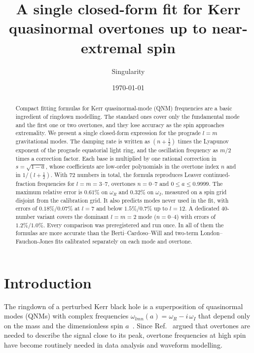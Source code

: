 \documentclass[prd,twocolumn,superscriptaddress,nofootinbib]{revtex4-2}
\begin{document}
\title{A single closed-form fit for Kerr quasinormal overtones up to near-extremal spin}

\author{Singularity}
\affiliation{}

\date{\today}

\begin{abstract}
Compact fitting formulas for Kerr quasinormal-mode (QNM) frequencies are a basic ingredient of ringdown modelling.
The standard ones cover only the fundamental mode and the first one or two overtones, and they lose accuracy as the
spin approaches extremality. We present a single closed-form expression for the prograde $l=m$ gravitational modes.
The damping rate is written as $(n+\tfrac12)$ times the Lyapunov exponent of the prograde equatorial light ring, and
the oscillation frequency as $m/2$ times a correction factor. Each base is multiplied by one rational correction in
$s=\sqrt{1-a}$, whose coefficients are low-order polynomials in the overtone index $n$ and in $1/(l+\tfrac12)$. With
72 numbers in total, the formula reproduces Leaver continued-fraction frequencies for $l=m=3$--$7$, overtones
$n=0$--$7$ and $0\le a\le 0.9999$. The maximum relative error is $0.61\%$ on $\omega_R$ and $0.32\%$ on $\omega_I$,
measured on a spin grid disjoint from the calibration grid. It also predicts modes never used in the fit, with errors
of $0.18\%/0.07\%$ at $l=7$ and below $1.5\%/0.7\%$ up to $l=12$. A dedicated 40-number variant covers the dominant
$l=m=2$ mode ($n=0$--$4$) with errors of $1.2\%/1.0\%$. Every comparison was preregistered and run once. In all of
them the formulas are more accurate than the Berti--Cardoso--Will and two-term London--Fauchon-Jones fits calibrated
separately on each mode and overtone.
\end{abstract}

\maketitle

\section{Introduction}

The ringdown of a perturbed Kerr black hole is a superposition of quasinormal modes (QNMs) with complex frequencies
$\omega_{lmn}(a)=\omega_R-i\,\omega_I$ that depend only on the mass and the dimensionless spin $a$~\cite{Berti:2009kk}.
Since Ref.~\cite{Giesler:2019uxc} argued that overtones are needed to describe the signal close to its peak, overtone
frequencies at high spin have become routinely needed in data analysis and waveform modelling.
\end{document}
